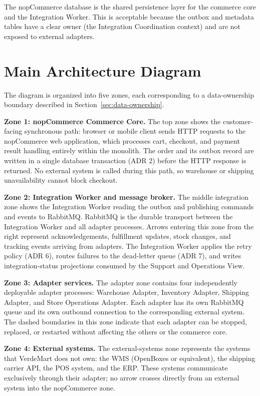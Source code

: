 The nopCommerce database is the shared persistence layer for the commerce core and the
Integration Worker. This is acceptable because the outbox and metadata tables have a clear
owner (the Integration Coordination context) and are not exposed to external adapters.

\section{Main Architecture Diagram}

The diagram is organized into five zones, each corresponding to a data-ownership boundary
described in Section~\ref{sec:data-ownership}.

\textbf{Zone 1: nopCommerce Commerce Core.} The top zone shows the customer-facing
synchronous path: browser or mobile client sends HTTP requests to the nopCommerce web
application, which processes cart, checkout, and payment result handling entirely within the
monolith. The order and its outbox record are written in a single database transaction (ADR 2)
before the HTTP response is returned. No external system is called during this path, so
warehouse or shipping unavailability cannot block checkout.

\textbf{Zone 2: Integration Worker and message broker.} The middle integration zone shows the
Integration Worker reading the outbox and publishing commands and events to RabbitMQ. RabbitMQ
is the durable transport between the Integration Worker and all adapter processes. Arrows
entering this zone from the right represent acknowledgements, fulfillment updates, stock
changes, and tracking events arriving from adapters. The Integration Worker applies the retry
policy (ADR 6), routes failures to the dead-letter queue (ADR 7), and writes integration-status
projections consumed by the Support and Operations View.

\textbf{Zone 3: Adapter services.} The adapter zone contains four independently deployable
adapter processes: Warehouse Adapter, Inventory Adapter, Shipping Adapter, and Store Operations
Adapter. Each adapter has its own RabbitMQ queue and its own outbound connection to the
corresponding external system. The dashed boundaries in this zone indicate that each adapter
can be stopped, replaced, or restarted without affecting the others or the commerce core.

\textbf{Zone 4: External systems.} The external-systems zone represents the systems that VerdeMart
does not own: the WMS (OpenBoxes or equivalent), the shipping carrier API, the POS system, and
the ERP. These systems communicate exclusively through their adapter; no arrow crosses directly
from an external system into the nopCommerce zone.

